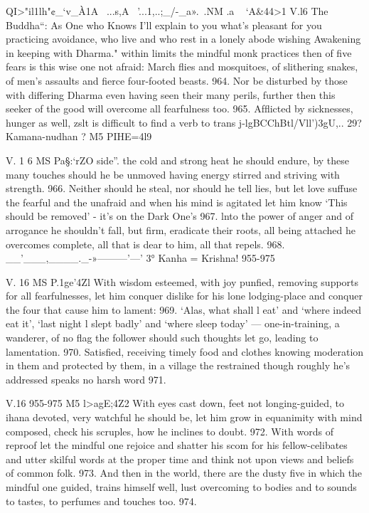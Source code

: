   
   
   QI>"il1lh"¢_`v_\`A1A  ~...s,A~  '...1,..;_/-_a».~.NM .a ~  `A&44>1%
   V.l6
   The Buddha“:
   As One who Knows I'll explain to you
   what's pleasant for you practicing avoidance,
   who live and who rest in a lonely abode
   wishing Awakening in keeping with Dharma."
   within limits the mindful monk practices
   then of ﬁve fears is this wise one not afraid:
   March ﬂies and mosquitoes, of slithering snakes,
   of men's assaults and ﬁerce four-footed beasts.
   964.
   Nor be disturbed by those with differing Dharma
   even having seen their many perils,
   further then this seeker of the good
   will overcome all fearfulness too.
   965.
   Afﬂicted by sicknesses, hunger as well,
   zslt is difficult to ﬁnd a verb to trans j-lgBCChBtl/Vll')3gU,..
   29? Kamana-nudhan ?
   M5 PIHE=4l9
   
   
   
   V. 1 6
   MS Pa§:`rZO
   side”.
   the cold and strong heat he should endure,
   by these many touches should he be unmoved
   having energy stirred and striving with strength.
   966.
   Neither should he steal, nor should he tell lies,
   but let love suffuse the fearful and the unafraid
   and when his mind is agitated let him know
   `This should be removed' - it's on the Dark One's
   967.
   lnto the power of anger and of arrogance
   he shouldn't fall, but ﬁrm, eradicate their roots,
   all being attached he overcomes complete,
   all that is dear to him, all that repels.
   968.
   __'___,____._-»———'—'
   3° Kanha = Krishna!
   955-975
   
   
   
   V. 16
   MS P.1ge'4Zl
   With wisdom esteemed, with joy punﬁed,
   removing supports for all fearfulnesses,
   let him conquer dislike for his lone lodging-place
   and conquer the four that cause him to lament:
   969.
   `Alas, what shall l eat' and `where indeed eat it',
   `last night l slept badly' and `where sleep today' —
   one-in-training, a wanderer, of no flag the follower
   should such thoughts let go, leading to lamentation.
   970.
   Satisﬁed, receiving timely food and clothes
   knowing moderation in them and
   protected by them, in a village the restrained
   though roughly he's addressed speaks no harsh word
   971.
   
   
   
   V.16 955-975
   M5 l>agE;4Z2
   With eyes cast down, feet not longing-guided,
   to ihana devoted, very watchful he should be,
   let him grow in equanimity with mind composed,
   check his scruples, how he inclines to doubt.
   972.
   With words of reproof let the mindful one rejoice
   and shatter his scom for his fellow-celibates
   and utter skilful words at the proper time
   and think not upon views and beliefs of common folk.
   973.
   And then in the world, there are the dusty ﬁve
   in which the mindful one guided, trains himself well,
   lust overcoming to bodies and to sounds
   to tastes, to perfumes and touches too.
   974.
   
